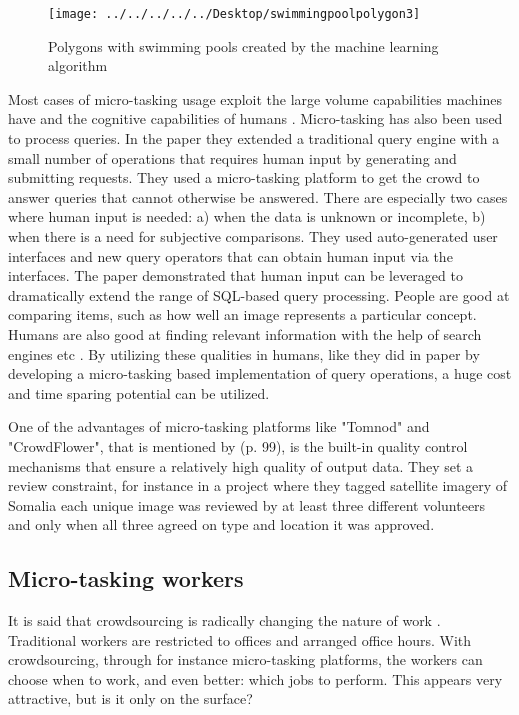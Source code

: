 \begin{figure}[H]
	\centering
	\texttt{[image: ../../../../../Desktop/swimmingpoolpolygon3]}
	\caption[Swimming pools  \citep{Nikki2016}]{Polygons with swimming pools created by the machine learning algorithm \citep{Nikki2016}}
	\label{fig:swimmingpoolpolygon3}
\end{figure}

Most cases of micro-tasking usage exploit the large volume capabilities machines have and the cognitive capabilities of humans \citep{Difallah2016}. Micro-tasking has also been used to process queries. In the \cite{Franklin2011} paper they extended a traditional query engine with a small number of operations that requires human input by generating and submitting requests.  They used a micro-tasking platform to get the crowd to answer queries that cannot otherwise be answered. There are especially two cases where human input is needed: a) when the data is unknown or incomplete, b) when there is a need for subjective comparisons. They used auto-generated user interfaces and new query operators that can obtain human input via the interfaces. The \cite{Franklin2011} paper demonstrated that human input can be leveraged to dramatically extend the range of SQL-based query processing. People are good at comparing items, such as how well an image represents a particular concept. Humans are also good at finding relevant information with the help of search engines etc \citep{Franklin2011}. By utilizing these qualities in humans, like they did in \citep{Franklin2011} paper by developing a micro-tasking based implementation of query operations, a huge cost and time sparing potential can be utilized. 

One of the advantages of micro-tasking platforms like "Tomnod" and "CrowdFlower", that is mentioned by \cite{Meier2013} (p. 99), is the built-in quality control mechanisms that ensure a relatively high quality of output data. They set a review constraint, for instance in a project where they tagged satellite imagery of Somalia each unique image was reviewed by at least three different volunteers and only when all three agreed on type and location it was approved. 

\subsection{Micro-tasking workers}
It is said that crowdsourcing is radically changing the nature of work \citep{Deng2016a}. Traditional workers are restricted to offices and arranged office hours. With crowdsourcing, through for instance micro-tasking platforms, the workers can choose when to work, and even better: which jobs to perform. This appears very attractive, but is it only on the surface? 

